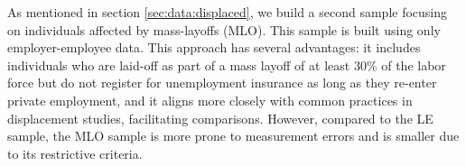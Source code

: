 

As mentioned in section \ref{sec:data:displaced}, we build a second sample focusing on individuals affected by mass-layoffs (MLO). This sample is built using only employer-employee data. This approach has several advantages: it includes individuals who are laid-off as part of a mass layoff of at least 30\% of the labor force
but do not register for unemployment insurance as long as they re-enter private employment, and it aligns more closely with common practices in displacement studies, facilitating comparisons. %
However, compared to the LE sample, the MLO sample is more prone to measurement errors and is smaller due to its restrictive criteria.


